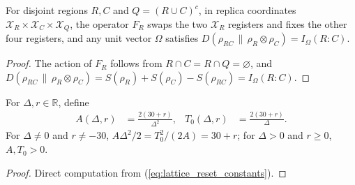 \begin{lemma}
    \label{thm:peps_reset_regional_coordinates}
    For disjoint regions $R,C$ and $Q=(R\cup C)^c$, in replica coordinates $\mathcal X_R\times\mathcal X_C\times\mathcal X_Q$, the operator $F_R$ swaps the two $\mathcal X_R$ registers and fixes the other four registers, and any unit vector $\Omega$ satisfies $D(\rho_{RC}\,\|\,\rho_R\otimes\rho_C)=I_\Omega(R:C)$.
\end{lemma}
\begin{proof}
    The action of $F_R$ follows from $R\cap C=R\cap Q=\varnothing$, and $D(\rho_{RC}\,\|\,\rho_R\otimes\rho_C)=S(\rho_R)+S(\rho_C)-S(\rho_{RC})=I_\Omega(R:C)$.
\end{proof}

\begin{definition}
    \label{def:lattice_reset_constants}
    \leanok
    For $\Delta,r\in\mathbb R$, define
    \begin{align}
        A(\Delta,r) & =\frac{2(30+r)}{\Delta^2}, & T_0(\Delta,r) & =\frac{2(30+r)}{\Delta}.
        \label{eq:lattice_reset_constants}
    \end{align}
    For $\Delta\neq0$ and $r\neq-30$, $A\Delta^2/2=T_0^2/(2A)=30+r$; for $\Delta>0$ and $r\ge0$, $A,T_0>0$.
\end{definition}

\begin{proof}\leanok
    Direct computation from (\ref{eq:lattice_reset_constants}).
\end{proof}

